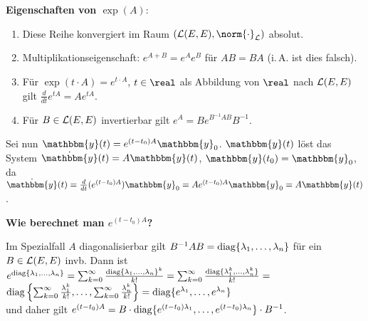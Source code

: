 \textbf{Eigenschaften von $\exp(A)$}:
\begin{enumerate}
    \item
    Diese Reihe konvergiert im Raum $(\L(E, E), \norm{\cdot}_\L)$ absolut.

    \item
    Multiplikationseigenschaft:
    $e^{A + B} = e^A e^B$ für $AB = BA$ (i.\,A. ist dies falsch).

    \item
    Für $\exp(t \cdot A) = e^{t \cdot A}$, $t \in \real$ als
    Abbildung von $\real$ nach $\mathcal{L}(E, E)$ gilt
    $\frac{d}{dt} e^{tA} = A e^{tA}$.

    \item
    Für $B \in \mathcal{L}(E, E)$ invertierbar gilt
    $e^A = B e^{B^{-1}AB} B^{-1}$.
\end{enumerate}

Sei nun $\mathbbm{y}(t) = e^{(t - t_0) A} \mathbbm{y}_0$.
$\mathbbm{y}(t)$ löst das System $\dot{\mathbbm{y}}(t) = A \mathbbm{y}(t)$,
$\mathbbm{y}(t_0) = \mathbbm{y}_0$, da \\
$\dot{\mathbbm{y}}(t) = \frac{d}{dt} (e^{(t - t_0) A}) \mathbbm{y}_0 =
A e^{(t - t_0) A} \mathbbm{y}_0 = A \mathbbm{y}(t)$.

\linie

\textbf{Wie berechnet man $e^{(t - t_0) A}$?}

Im Spezialfall $A$ diagonalisierbar gilt
$B^{-1} A B = \operatorname{diag}\{\lambda_1, \dotsc, \lambda_n\}$
für ein $B \in \mathcal{L}(E, E)$ invb.
Dann ist
$e^{\operatorname{diag}\{\lambda_1, \dotsc, \lambda_n\}} =
\sum_{k=0}^\infty \frac{\operatorname{diag}\{\lambda_1, \dotsc, \lambda_n\}^k}{k!} =
\sum_{k=0}^\infty \frac{\operatorname{diag}\{\lambda_1^k, \dotsc, \lambda_n^k\}}{k!} =$ \\
$\operatorname{diag}\left\{\sum_{k=0}^\infty \frac{\lambda_1^k}{k!}, \dotsc,
\sum_{k=0}^\infty \frac{\lambda_n^k}{k!}\right\} =
\operatorname{diag}\{e^{\lambda_1}, \dotsc, e^{\lambda_n}\}$ \\
und daher gilt
$e^{(t - t_0) A} =
B \cdot \operatorname{diag}\{e^{(t - t_0) \lambda_1}, \dotsc,
e^{(t - t_0) \lambda_n}\} \cdot B^{-1}$.

